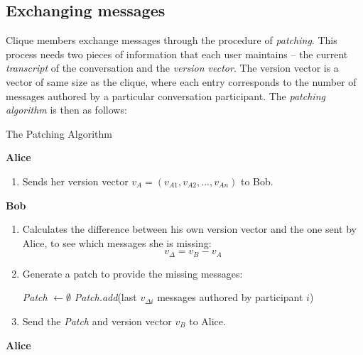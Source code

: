 \documentclass[a4paper, 12pt]{report}
\begin{document}
\subsection{Exchanging messages}
\label{subsec:prep.patching}
Clique members exchange messages through the procedure of \emph{patching}. This process needs two pieces of information that each user maintains -- the current \emph{transcript} of the conversation and the \emph{version vector}. The version vector is a vector of same size as the clique, where each entry corresponds to the number of messages authored by a particular conversation participant. The \emph{patching algorithm} is then as follows:
\begin{algorithm}
\caption{The Patching Algorithm}
\label{alg:patching}
\vspace{2pt}
{\bfseries Alice}
\begin{enumerate}[topsep=2pt, itemsep=2pt]
    \item Sends her version vector $v_A = (v_{A1}, v_{A2}, ..., v_{An})$ to Bob. \\
\end{enumerate}
\vspace{-2pt}
{\bfseries Bob}
\begin{enumerate}[topsep=2pt, itemsep=2pt]
    \item Calculates the difference between his own version vector and the one sent by Alice, to see which messages she is missing:
        \begin{equation*}
            v_{\Delta} = v_B - v_A
        \end{equation*}
    \item {Generate a patch to provide the missing messages: \newline \vspace{-5mm}}
        \begin{algorithmic}
            \STATE \textit{Patch} $\leftarrow \emptyset$
                    \STATE \textit{Patch.add}(last $v_{\Delta i}$ messages authored by participant $i$)                        
                \ENDIF
            \ENDFOR
        \end{algorithmic}
    \item Send the \textit{Patch} and version vector $v_B$ to Alice. \\
\end{enumerate}
\vspace{-2pt}
{\bfseries Alice}
\begin{enumerate}[topsep=2pt, itemsep=2pt]

\end{enumerate}
\end{algorithm}
\end{document}
